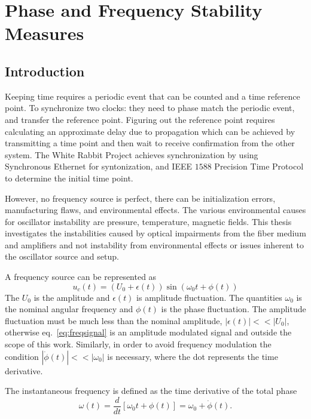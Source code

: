 \chapter{Phase and Frequency Stability Measures}
\label{chap:time_stability}

\section{Introduction}

Keeping time requires a periodic event that can be counted and a time reference point.  To synchronize two clocks: they need to phase match the periodic event, and transfer the reference point. Figuring out the reference point requires calculating an approximate delay due to propagation which can be achieved by transmitting a time point and then wait to receive confirmation from the other system. The White Rabbit Project achieves synchronization by using Synchronous Ethernet for syntonization, and IEEE $1588$ Precision Time Protocol to determine the initial time point. 

However, no frequency source is perfect, there can be initialization errors, manufacturing flaws, and environmental effects. The various environmental causes for oscillator instability are pressure, temperature, magnetic fields. %
This thesis investigates the instabilities caused by optical impairments from the fiber medium and amplifiers and not instability from environmental effects or issues inherent to the oscillator source and setup.

A frequency source can be represented as 
%
\begin{equation}
	\label{eq:freqsignal}
	u_c(t) = (U_0 + \epsilon(t)) \sin(\omega_0t + \phi(t))
\end{equation}
%
The $U_0$ is the amplitude and $\epsilon(t)$ is amplitude fluctuation. The quantities $\omega_0$ is the nominal angular frequency and $\phi(t)$ is the phase fluctuation. The amplitude fluctuation must be much less than the nominal amplitude, $|\epsilon(t)| << |U_0|$, otherwise eq.~\ref{eq:freqsignal} is an amplitude modulated signal and outside the scope of this work.  Similarly, in order to avoid frequency modulation the condition $|\dot{\phi}(t)| << |\omega_0|$ is necessary, where the dot represents the time derivative.

The instantaneous frequency is defined as the time derivative of the total phase
%
\begin{equation}
	\omega(t) = \frac{d}{dt}\left[ \omega_0t + \phi(t)\right] = \omega_0 + \dot{\phi}(t).
\end{equation}
%

